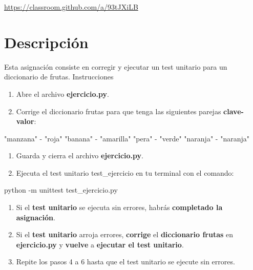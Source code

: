 \documentclass[
  a4paper,
  DIV=11,
  numbers=noendperiod,
  onepage,
  openany]{scrreprt}
\newenvironment{Shaded}{\begin{snugshade}}{\end{snugshade}}
\newcommand{\AttributeTok}[1]{\textcolor[rgb]{0.40,0.45,0.13}{#1}}
\newcommand{\CommentTok}[1]{\textcolor[rgb]{0.37,0.37,0.37}{#1}}
\newcommand{\ExtensionTok}[1]{\textcolor[rgb]{0.00,0.23,0.31}{#1}}
\newcommand{\NormalTok}[1]{\textcolor[rgb]{0.00,0.23,0.31}{#1}}
\newcommand{\OperatorTok}[1]{\textcolor[rgb]{0.37,0.37,0.37}{#1}}
\newcommand{\StringTok}[1]{\textcolor[rgb]{0.13,0.47,0.30}{#1}}
\providecommand{\tightlist}{%
  \setlength{\itemsep}{0pt}\setlength{\parskip}{0pt}}\usepackage{longtable,booktabs,array}
\begin{document}
\href{https://classroom.github.com/a/fLX28sJ9}{https://classroom.github.com/a/93tJXiLB}

\section{Descripción}\label{descripciuxf3n}

Esta asignación consiste en corregir y ejecutar un test unitario para un
diccionario de frutas. Instrucciones

\begin{enumerate}
\def\labelenumi{\arabic{enumi}.}
\tightlist
\item
  Abre el archivo \textbf{ejercicio.py}.
\item
  Corrige el diccionario frutas para que tenga las siguientes parejas
  \textbf{clave-valor}:
\end{enumerate}

\begin{Shaded}
\begin{Highlighting}[]
\CommentTok{"manzana"} \OperatorTok{{-}} \StringTok{"roja"}
\CommentTok{"banana"} \OperatorTok{{-}} \StringTok{"amarilla"}
\CommentTok{"pera"} \OperatorTok{{-}} \StringTok{"verde"}
\CommentTok{"naranja"} \OperatorTok{{-}} \StringTok{"naranja"}
\end{Highlighting}
\end{Shaded}

\begin{enumerate}
\def\labelenumi{\arabic{enumi}.}
\setcounter{enumi}{2}
\tightlist
\item
  Guarda y cierra el archivo \textbf{ejercicio.py}.
\item
  Ejecuta el test unitario test\_ejercicio en tu terminal con el
  comando:
\end{enumerate}

\begin{Shaded}
\begin{Highlighting}[]
\ExtensionTok{python} \AttributeTok{{-}m}\NormalTok{ unittest test\_ejercicio.py}
\end{Highlighting}
\end{Shaded}

\begin{enumerate}
\def\labelenumi{\arabic{enumi}.}
\setcounter{enumi}{4}
\tightlist
\item
  Si el \textbf{test unitario} se ejecuta sin errores, habrás
  \textbf{completado la asignación}.
\item
  Si el \textbf{test unitario} arroja errores, \textbf{corrige} el
  \textbf{diccionario frutas} en \textbf{ejercicio.py} y \textbf{vuelve}
  a \textbf{ejecutar el test unitario}.
\item
  Repite los pasos 4 a 6 hasta que el test unitario se ejecute sin
  errores.
\end{enumerate}
\end{document}
